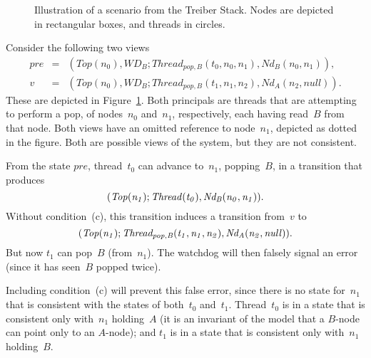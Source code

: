 
\begin{figure}\small
\def\addLabel#1#2{\draw #1++(0,0.5) node {#2};}
\begin{center}
\end{center}
\caption{Illustration of a scenario from the Treiber Stack.  Nodes are
  depicted in rectangular boxes, and threads in circles.}
\label{fig:missingCommon}
\end{figure}


Consider the following two views
%
\begin{eqnarray*}
pre & = &  (Top(n_0), WD_B; Thread_{pop,B}(t_0, n_0, n_1), Nd_B(n_0, n_1)), \\
v & = & (Top(n_0), WD_B; Thread_{pop,B}(t_1, n_1, n_2), Nd_A(n_2, null)).
\end{eqnarray*}
%
These are depicted in Figure~\ref{fig:missingCommon}.  Both principals are
threads that are attempting to perform a pop, of nodes~$n_0$ and~$n_1$,
respectively, each having read~$B$ from that node.  Both views have an omitted
reference to node~$n_1$, depicted as dotted in the figure.  Both are possible
views of the system, but they are not consistent.

From the state $pre$, thread~$t_0$ can advance  to~$n_1$,
popping~$B$, in a transition that produces
\[\mit
(Top(n_1); Thread(t_0), Nd_B(n_0, n_1)).
\]
Without condition~(c), this transition  induces a transition from~$v$ to
\[\mit
(Top(n_1); Thread_{pop,B}(t_1, n_1, n_2), Nd_A(n_2, null)).
\]
But now $t_1$ can pop~$B$ (from~$n_1$).  The watchdog will then falsely signal
an error (since it has seen~$B$ popped twice). 

Including condition~(c) will prevent this false error, since there is no state
for~$n_1$ that is consistent with the states of both~$t_0$ and~$t_1$.
Thread~$t_0$ is in a state that is consistent only with~$n_1$ holding~$A$ (it
is an invariant of the model that a $B$-node can point only to an $A$-node);
and $t_1$ is in a state that is consistent only with~$n_1$ holding~$B$.

